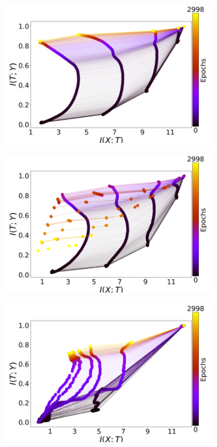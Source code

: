 \documentclass[conference, 5pt]{IEEEtran}
\begin{document}
\begin{figure}
	\begin{subfigure}{0.32\linewidth}
    \label{fig:tanh_activation}
	\includegraphics[width=\columnwidth]{activations/tanh.png}
    \end{subfigure}
    	\begin{subfigure}{0.32\linewidth}
    \label{fig:elu_activation}
\includegraphics[width=\columnwidth]{activations/elu.png}
\end{subfigure}
    	\begin{subfigure}{0.32\linewidth}
    \label{fig:sigmoid_activation}
	\includegraphics[width=\columnwidth]{activations/sigmoid.png}

\end{subfigure}
\end{figure}
\end{document}
